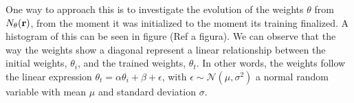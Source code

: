 One way to approach this is to investigate the evolution of the weights $\theta$ from
$N_{\theta}(\mathbf{r})$, from the moment it was initialized to the moment its training finalized.
A histogram of this can be seen in figure (Ref a figura). We can observe that the way
the weights show a diagonal represent a linear relationship between the initial
weights, $\theta_{i}$, and the trained weights, $\theta_{t}$. In other words,
the weights follow the linear expression
$\theta_{t} = \alpha \theta_{i} + \beta + \epsilon$, with
$\epsilon \sim \mathcal{N}(\mu, \sigma^{2})$ a normal random variable with mean
$\mu$ and standard deviation $\sigma$.
